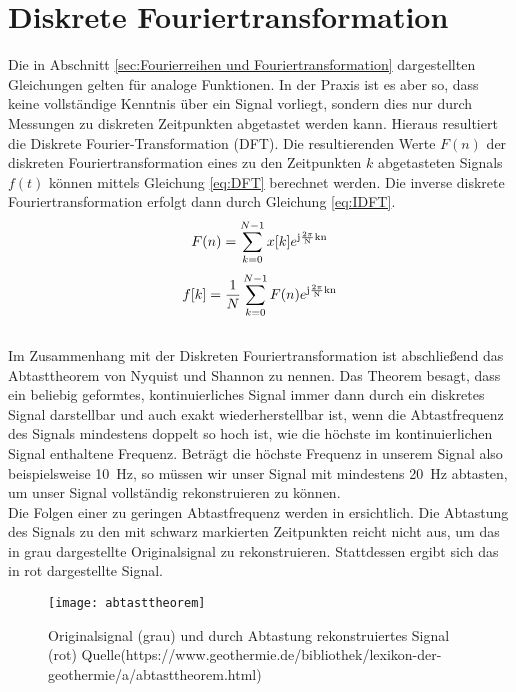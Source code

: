 \section{Diskrete Fouriertransformation}
Die in Abschnitt \ref{sec:Fourierreihen und Fouriertransformation} dargestellten Gleichungen gelten für analoge Funktionen. In der Praxis ist es aber so, dass keine vollständige Kenntnis über ein Signal vorliegt, sondern dies nur durch Messungen zu diskreten Zeitpunkten abgetastet werden kann. Hieraus resultiert die Diskrete Fourier-Transformation (DFT). Die resultierenden Werte $F(n)$ der diskreten Fouriertransformation eines zu den Zeitpunkten $k$ abgetasteten Signals $f(t)$ können mittels Gleichung \ref{eq:DFT} berechnet werden. Die inverse diskrete Fouriertransformation erfolgt dann durch Gleichung \ref{eq:IDFT}.
\begin{equation}
	\label{eq:DFT}
	F(n) = \sum_{k=0}^{N-1}x[k]e^{\mathrm{j\frac{2\pi}{N}kn}}
\end{equation}
\begin{equation}
	\label{eq:IDFT}
	f[k] = \frac{1}{N}\sum_{k=0}^{N-1}F(n)e^{\mathrm{j\frac{2\pi}{N}kn}}
\end{equation} \\
Im Zusammenhang mit der Diskreten Fouriertransformation ist abschließend das Abtasttheorem von Nyquist und Shannon zu nennen. Das Theorem besagt, dass ein beliebig geformtes, kontinuierliches Signal immer dann durch ein diskretes Signal darstellbar und auch exakt wiederherstellbar ist, wenn die Abtastfrequenz des Signals mindestens doppelt so hoch ist, wie die höchste im kontinuierlichen Signal enthaltene Frequenz. Beträgt die höchste Frequenz in unserem Signal also beispielsweise \SI{10}{\Hz}, so müssen wir unser Signal mit mindestens \SI{20}{\Hz} abtasten, um unser Signal vollständig rekonstruieren zu können. \\
Die Folgen einer zu geringen Abtastfrequenz werden in  ersichtlich. Die Abtastung des Signals zu den mit schwarz markierten Zeitpunkten reicht nicht aus, um das in grau dargestellte Originalsignal zu rekonstruieren. Stattdessen ergibt sich das in rot dargestellte Signal.
\begin{figure}[!ht]
	\begin{center}
		\texttt{[image: abtasttheorem]}
		\caption{Originalsignal (grau) und durch Abtastung rekonstruiertes Signal (rot) Quelle(https://www.geothermie.de/bibliothek/lexikon-der-geothermie/a/abtasttheorem.html)}
		\label{fig.Abtasttheorem}
	\end{center}
\end{figure}


